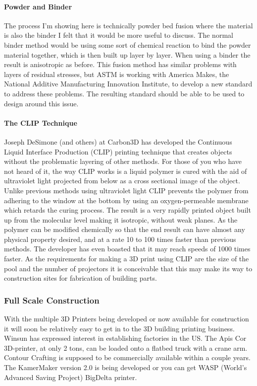 \documentclass[11pt]{article}
\begin{document}
\paragraph{Powder and Binder}
The process I'm showing here is technically powder bed fusion where the material is also the binder I felt that it would be more useful to discuss.  The normal binder method would be using some sort of chemical reaction to bind the powder material together, which is then built up layer by layer.  When using a binder the result is anisotropic as before.  This fusion method has similar problems with layers of residual stresses, but ASTM is working with America Makes, the National Additive Manufacturing Innovation Institute, to develop a new standard to address these problems.  The resulting standard should be able to be used to design around this issue.
\paragraph{The CLIP Technique}
Joseph DeSimone (and others) at Carbon3D has developed the Continuous Liquid Interface Production (CLIP) printing technique that creates objects without the problematic layering of other methods.  For those of you who have not heard of it, the way CLIP works is a liquid polymer is cured with the aid of ultraviolet light projected from below as a cross sectional image of the object.  Unlike previous methods using ultraviolet light CLIP prevents the polymer from adhering to the window at the bottom by using an oxygen-permeable membrane which retards the curing process.  The result is a very rapidly printed object built up from the molecular level making it isotropic, without weak planes.  As the polymer can be modified chemically so that the end result can have almost any physical property desired, and at a rate 10 to 100 times faster than previous methods.  The developer has even boasted that it may reach speeds of 1000 times faster.  As the requirements for making a 3D print using CLIP are the size of the pool and the number of projectors it is conceivable that this may make its way to construction sites for fabrication of building parts.
\subsubsection{Full Scale Construction}
With the multiple 3D Printers being developed or now available for construction it will soon be relatively easy to get in to the 3D building printing business.  Winsun has expressed interest in establishing factories in the US.  The Apis Cor 3D-printer, at only 2 tons, can be loaded onto a flatbed truck with a crane arm.  Contour Crafting is supposed to be commercially available within a couple years.  The KamerMaker version 2.0 is being developed or you can get WASP (World’s Advanced Saving Project) BigDelta printer.
\end{document}
